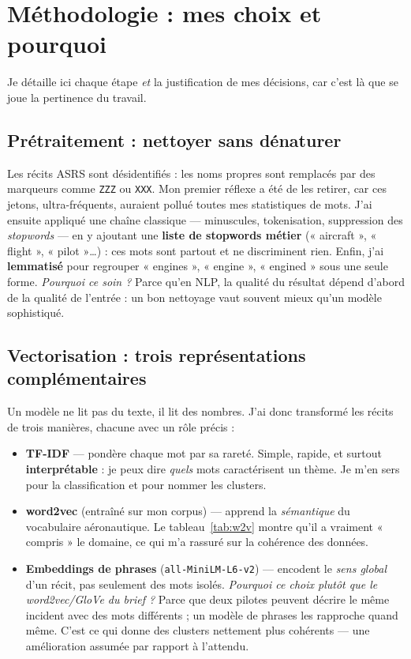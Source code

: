 \documentclass[11pt,a4paper]{article}
\begin{document}
\section{Méthodologie : mes choix et pourquoi}

Je détaille ici chaque étape \emph{et} la justification de mes décisions, car c'est là que
se joue la pertinence du travail.

\subsection{Prétraitement : nettoyer sans dénaturer}
Les récits ASRS sont désidentifiés : les noms propres sont remplacés par des marqueurs
comme \texttt{ZZZ} ou \texttt{XXX}. Mon premier réflexe a été de les retirer, car ces
jetons, ultra-fréquents, auraient pollué toutes mes statistiques de mots. J'ai ensuite
appliqué une chaîne classique — minuscules, tokenisation, suppression des \emph{stopwords}
— en y ajoutant une \textbf{liste de stopwords métier} (« aircraft », « flight »,
« pilot »\ldots) : ces mots sont partout et ne discriminent rien. Enfin, j'ai
\textbf{lemmatisé} pour regrouper « engines », « engine », « engined » sous une seule
forme. \emph{Pourquoi ce soin ?} Parce qu'en NLP, la qualité du résultat dépend d'abord
de la qualité de l'entrée : un bon nettoyage vaut souvent mieux qu'un modèle sophistiqué.

\subsection{Vectorisation : trois représentations complémentaires}
Un modèle ne lit pas du texte, il lit des nombres. J'ai donc transformé les récits de
trois manières, chacune avec un rôle précis :
\begin{itemize}[leftmargin=1.4em]
  \item \textbf{TF-IDF} — pondère chaque mot par sa rareté. Simple, rapide, et surtout
  \textbf{interprétable} : je peux dire \emph{quels} mots caractérisent un thème. Je m'en
  sers pour la classification et pour nommer les clusters.
  \item \textbf{word2vec} (entraîné sur mon corpus) — apprend la \emph{sémantique} du
  vocabulaire aéronautique. Le tableau~\ref{tab:w2v} montre qu'il a vraiment « compris »
  le domaine, ce qui m'a rassuré sur la cohérence des données.
  \item \textbf{Embeddings de phrases} (\texttt{all-MiniLM-L6-v2}) — encodent le \emph{sens
  global} d'un récit, pas seulement des mots isolés. \emph{Pourquoi ce choix plutôt que le
  word2vec/GloVe du brief ?} Parce que deux pilotes peuvent décrire le même incident avec
  des mots différents ; un modèle de phrases les rapproche quand même. C'est ce qui donne
  des clusters nettement plus cohérents — une amélioration assumée par rapport à l'attendu.
\end{itemize}
\end{document}
